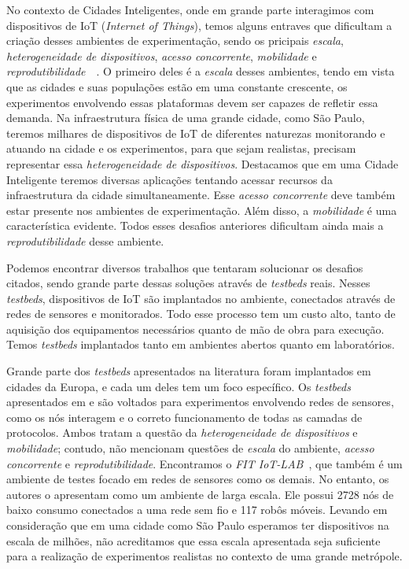No contexto de Cidades Inteligentes, onde em grande parte interagimos com dispositivos de IoT (\textit{Internet of Things}), temos alguns entraves que dificultam a criação desses ambientes de
experimentação, sendo os pricipais \textit{escala}, \textit{heterogeneidade de dispositivos}, \textit{acesso concorrente}, \textit{mobilidade} e 
\textit{reprodutibilidade}~\citep{gluhak_2011}~\citep{sanchez_2014}.
O primeiro deles é a \textit{escala} desses ambientes, tendo em vista que as cidades e suas populações estão em uma constante crescente, os experimentos envolvendo essas plataformas devem ser capazes
de refletir essa demanda.
Na infraestrutura física de uma grande cidade, como São Paulo, teremos milhares de dispositivos de IoT de diferentes naturezas monitorando e atuando na cidade e os experimentos, para que sejam realistas,
precisam representar essa \textit{heterogeneidade de dispositivos}.
Destacamos que em uma Cidade Inteligente teremos diversas aplicações tentando acessar recursos da infraestrutura da cidade simultaneamente.
Esse \textit{acesso concorrente} deve também estar presente nos ambientes de experimentação.
Além disso, a \textit{mobilidade} é uma característica evidente.
Todos esses desafios anteriores dificultam ainda mais a \textit{reprodutibilidade} desse ambiente.

Podemos encontrar diversos trabalhos que tentaram solucionar os desafios citados, sendo grande parte dessas soluções através de \textit{testbeds} reais.
Nesses \textit{testbeds}, dispositivos de IoT são implantados no ambiente, conectados através de redes de sensores e monitorados.
Todo esse processo tem um custo alto, tanto de aquisição dos equipamentos necessários quanto de mão de obra para execução.
Temos \textit{testbeds} implantados tanto em ambientes abertos quanto em laboratórios.

Grande parte dos \textit{testbeds} apresentados na literatura foram implantados em cidades da Europa, e cada um deles tem um foco específico.
Os \textit{testbeds} apresentados em  \cite{olivares_2013} e \cite{cenedese_2014} são voltados para experimentos envolvendo redes de sensores, como os nós interagem e o correto
funcionamento de todas as camadas de protocolos.
Ambos tratam a questão da \textit{heterogeneidade de dispositivos} e \textit{mobilidade}; contudo, não mencionam questões de \textit{escala} do ambiente,
\textit{acesso concorrente} e \textit{reprodutibilidade}.
Encontramos o \textit{FIT IoT-LAB}~\citep{adjih_2015}, que também é um ambiente de testes focado em redes de sensores como os demais.
No entanto, os autores o apresentam como um ambiente de larga escala.
Ele possui 2728 nós de baixo consumo conectados a uma rede sem fio e 117 robôs móveis.
Levando em consideração que em uma cidade como São Paulo esperamos ter dispositivos na escala de milhões, não acreditamos que essa escala apresentada seja suficiente para a realização de experimentos
realistas no contexto de uma grande metrópole.

